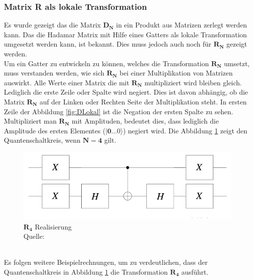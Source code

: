 \subsubsection{Matrix R als lokale Transformation}
Es wurde gezeigt das die Matrix $\mathbf{D_N}$ in ein Produkt aus Matrizen zerlegt werden kann. Das die Hadamar Matrix mit Hilfe eines Gatters als lokale Transformation umgesetzt werden kann, ist bekannt. Dies muss jedoch auch noch für $\mathbf{R_N}$ gezeigt werden. 
\\
Um ein Gatter zu entwickeln zu können, welches die Transformation $\mathbf{R_N}$ umsetzt, muss verstanden werden, wie sich $\mathbf{R_N}$ bei einer Multiplikation von Matrizen auswirkt. Alle Werte einer Matrix die mit $\mathbf{R_N}$ multipliziert wird bleiben gleich. Lediglich die erste Zeile oder Spalte wird negiert. Dies ist davon abhängig, ob die Matrix $\mathbf{R_N}$ auf der Linken oder Rechten Seite der Multiplikation steht. In ersten Zeile der Abbildung \ref{fig:DLokal} ist die Negation der ersten Spalte zu sehen.
\\
Multipliziert man $\mathbf{R_N}$ mit Amplituden, bedeutet dies, dass lediglich die Amplitude des ersten Elementes ($\mathbf{|0...0\rangle}$) negiert wird.
Die Abbildung \ref{fig:Rgatter} zeigt den Quantenschaltkreis, wenn $\mathbf{N = 4}$ gilt.
 \begin{figure}[hbtp]
 	\centering
 	\includegraphics[width=.8\textwidth]{figures/rgatter.png}
 	\caption{$\mathbf{R_4}$ Realisierung \\ Quelle: \cite[S. 145]{Ho17}}
 	\label{fig:Rgatter}
 \end{figure}
\\
Es folgen weitere Beispielrechnungen, um zu verdeutlichen, dass der Quantenschaltkreis in Abbildung \ref{fig:Rgatter} die Transformation $\mathbf{R_4}$ ausführt.
